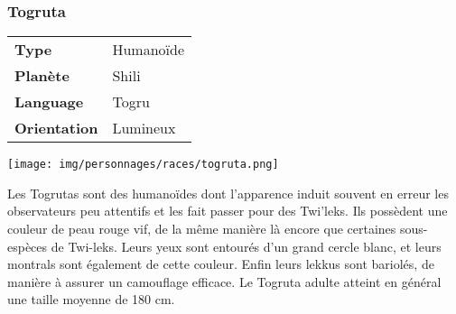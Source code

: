 \subsubsection{Togruta}
\begin{samepage}
	\begin{tabular}{ l l }
		\textbf{Type} 			& Humanoïde \\
	   	\textbf{Planète} 		& Shili \\
	   	\textbf{Language} 		& Togru \\
	   	\textbf{Orientation} 	& Lumineux \\
	\end{tabular}

	\vspace{-9\baselineskip}
	\begin{flushright}
		\texttt{[image: img/personnages/races/togruta.png]}
	\end{flushright}

	\vspace{-2\baselineskip}
\end{samepage}

Les Togrutas sont des humanoïdes dont l'apparence induit souvent en erreur les observateurs peu attentifs et les fait passer pour des Twi'leks. Ils possèdent une couleur de peau rouge vif, de la même manière là encore que certaines sous-espèces de Twi-leks. Leurs yeux sont entourés d'un grand cercle blanc, et leurs montrals sont également de cette couleur. Enfin leurs lekkus sont bariolés, de manière à assurer un camouflage efficace. Le Togruta adulte atteint en général une taille moyenne de 180 cm. 



